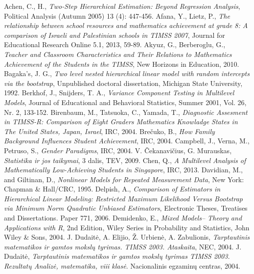 \documentclass[12pt,a4paper]{article}
\begin{document}
 \renewcommand\refname{LITERATŪRA IR ŠALTINIAI}
\begin{thebibliography}{1}
 Achen, C., H., \textit{Two-Step Hierarchical Estimation: Beyond Regression Analysis},  Political Analysis (Autumn 2005) 13 (4): 447-456.
 Afana, Y., Lietz, P., \textit{The relationship between school resources and mathematics achievement at grade 8: A comparison of Israeli and Palestinian schools in TIMSS 2007}, Journal for Educational Research Online 5.1, 2013, 59-89.
 Akyuz, G., Berberoglu, G., \textit{Teacher and Classroom Characteristics and Their Relations to Mathematics Achievement of the Students in the TIMSS}, New Horizons in Education, 2010.
 Bagaka's, J. G., \textit{Two level nested hierarchical linear model with random intercepts via the bootstrap}, Unpublished doctoral dissertation, Michigan State University, 1992.
 Berkhof, J., Snijders, T. A., \textit{Variance Component Testing in Multilevel Models}, Journal of Educational and Behavioral Statistics, Summer 2001, Vol. 26, Nr. 2, 133-152.
 Birenbaum, M., Tatsuoka, C., Yamada, T., \textit{Diagnostic Assesment in TIMSS-R: Comparison of Eight Graders Mathematics Knowladge States in The United States, Japan, Israel}, IRC, 2004.
 Brečuko, B., \textit{How Family Background Influences Student Achievement}, IRC, 2004.
 Campbell, J., Verna, M., Petruso, S., \textit{Gender Paradigms}, IRC, 2004.
 V. Čekanavičius, G. Murauskas, \textit{Statistika ir jos taikymai}, 3 dalis, TEV, 2009.
 Chen, Q., \textit{A Multilevel Analysis of Mathematically Low-Achieving Students in Singapore}, IRC, 2013.
 Davidian, M., and Giltinan, D., \textit{Nonlinear Models for Repeated Measurement Data}, New York: Chapman \& Hall/CRC, 1995.
 Delpish, A., \textit{Comparison of Estimators in Hierarchical Linear Modeling: Restricted Maximum Likelihood Versus Bootstrap via Minimum Norm Quadratic Unbiased Estimators}, Electronic Theses, Treatises and Dissertations. Paper 771, 2006.
 Demidenko, E., \textit{Mixed Models– Theory and Applications with R}, 2nd Edition, Wiley Series in Probability and Statistics, John Wiley \& Sons, 2004.
 J. Dudaitė, A. Elijio, Ž. Urbienė, A. Zabulionis, \textit{Tarptautinis matematikos ir gamtos mokslų tyrimas. TIMSS 2003. Ataskaita}, NEC, 2004.
 J. Dudaitė, \textit{Tarptautinis matematikos ir gamtos mokslų tyrimas TIMSS 2003. Rezultatų Analizė, matematika, viii klasė}. Nacionalinis egzaminų centras, 2004.

\end{thebibliography}
\end{document}
